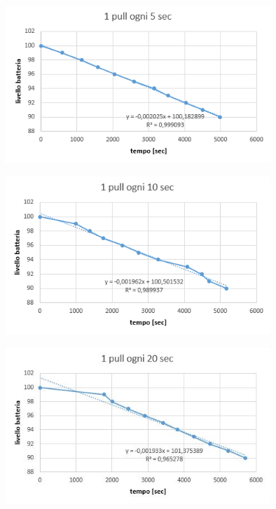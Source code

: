 \documentclass{article}
\begin{document}
\begin{center}
\includegraphics[width=0.75\textwidth]{5alsec.jpg} %
\label{fig:1 pull ogni 5 secondi}
\end{center}

\begin{center}
\includegraphics[width=0.75\textwidth]{10alsec.jpg} %
\label{fig:1 pull ogni 10 secondi}
\end{center}

\begin{center}
\includegraphics[width=0.75\textwidth]{20alsec.jpg} %
\label{fig:1 pull ogni 20 secondi}
\end{center}

\end{document}
